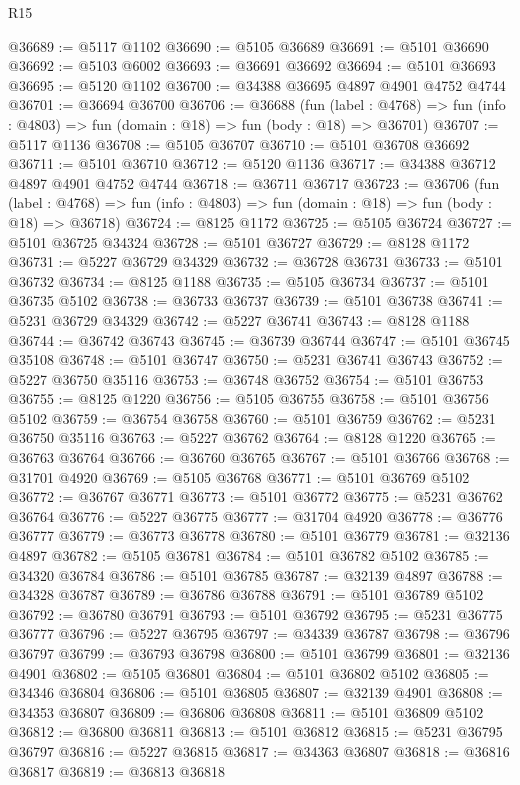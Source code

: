 \begin{lexlean}{R15}
\begin{coremodule}
{{{{{{{{{{{@36689 := @5117 @1102
@36690 := @5105 @36689
@36691 := @5101 @36690
@36692 := @5103 @6002
@36693 := @36691 @36692
@36694 := @5101 @36693
@36695 := @5120 @1102
@36700 := @34388 @36695 @4897 @4901 @4752 @4744
@36701 := @36694 @36700
@36706 := @36688
    (fun (label : @4768) => fun (info : @4803) => fun (domain : @18) => fun (body : @18) => @36701)
@36707 := @5117 @1136
@36708 := @5105 @36707
@36710 := @5101 @36708 @36692
@36711 := @5101 @36710
@36712 := @5120 @1136
@36717 := @34388 @36712 @4897 @4901 @4752 @4744
@36718 := @36711 @36717
@36723 := @36706
    (fun (label : @4768) => fun (info : @4803) => fun (domain : @18) => fun (body : @18) => @36718)
@36724 := @8125 @1172
@36725 := @5105 @36724
@36727 := @5101 @36725 @34324
@36728 := @5101 @36727
@36729 := @8128 @1172
@36731 := @5227 @36729 @34329
@36732 := @36728 @36731
@36733 := @5101 @36732
@36734 := @8125 @1188
@36735 := @5105 @36734
@36737 := @5101 @36735 @5102
@36738 := @36733 @36737
@36739 := @5101 @36738
@36741 := @5231 @36729 @34329
@36742 := @5227 @36741
@36743 := @8128 @1188
@36744 := @36742 @36743
@36745 := @36739 @36744
@36747 := @5101 @36745 @35108
@36748 := @5101 @36747
@36750 := @5231 @36741 @36743
@36752 := @5227 @36750 @35116
@36753 := @36748 @36752
@36754 := @5101 @36753
@36755 := @8125 @1220
@36756 := @5105 @36755
@36758 := @5101 @36756 @5102
@36759 := @36754 @36758
@36760 := @5101 @36759
@36762 := @5231 @36750 @35116
@36763 := @5227 @36762
@36764 := @8128 @1220
@36765 := @36763 @36764
@36766 := @36760 @36765
@36767 := @5101 @36766
@36768 := @31701 @4920
@36769 := @5105 @36768
@36771 := @5101 @36769 @5102
@36772 := @36767 @36771
@36773 := @5101 @36772
@36775 := @5231 @36762 @36764
@36776 := @5227 @36775
@36777 := @31704 @4920
@36778 := @36776 @36777
@36779 := @36773 @36778
@36780 := @5101 @36779
@36781 := @32136 @4897
@36782 := @5105 @36781
@36784 := @5101 @36782 @5102
@36785 := @34320 @36784
@36786 := @5101 @36785
@36787 := @32139 @4897
@36788 := @34328 @36787
@36789 := @36786 @36788
@36791 := @5101 @36789 @5102
@36792 := @36780 @36791
@36793 := @5101 @36792
@36795 := @5231 @36775 @36777
@36796 := @5227 @36795
@36797 := @34339 @36787
@36798 := @36796 @36797
@36799 := @36793 @36798
@36800 := @5101 @36799
@36801 := @32136 @4901
@36802 := @5105 @36801
@36804 := @5101 @36802 @5102
@36805 := @34346 @36804
@36806 := @5101 @36805
@36807 := @32139 @4901
@36808 := @34353 @36807
@36809 := @36806 @36808
@36811 := @5101 @36809 @5102
@36812 := @36800 @36811
@36813 := @5101 @36812
@36815 := @5231 @36795 @36797
@36816 := @5227 @36815
@36817 := @34363 @36807
@36818 := @36816 @36817
@36819 := @36813 @36818
}}}}}}}}}}}
\end{coremodule}
\end{lexlean}

